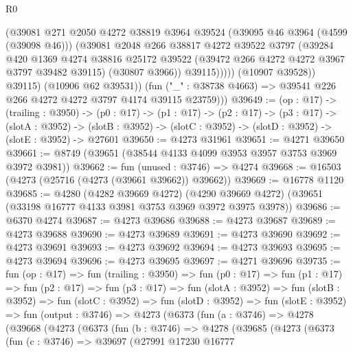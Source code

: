 \begin{lexlean}{R0}
\begin{coremodule}
                    (@39081
                      @271
                      @2050
                      @4272
                      @38819
                      @3964
                      @39524
                      (@39095 @46 @3964 (@4599 (@39098 @46)))
                      (@39081
                        @2048
                        @266
                        @38817
                        @4272
                        @39522
                        @3797
                        (@39284
                          @420
                          @1369
                          @4274
                          @38816
                          @25172
                          @39522
                          (@39472 @266 @4272 @4272 @3967 @3797 @39482 @39115)
                          (@30807 @3966))
                        @39115)))))
              (@10907 @39528))
            @39115)
          (@10906 @62 @39531))
        (fun ("_" : @38738 @4663) => @39541 @226 @266 @4272 @4272 @3797 @4174 @39115 @23759)))
@39649 := (op : @17) ->
  (trailing : @3950) ->
  (p0 : @17) ->
  (p1 : @17) ->
  (p2 : @17) ->
  (p3 : @17) ->
  (slotA : @3952) ->
  (slotB : @3952) -> (slotC : @3952) -> (slotD : @3952) -> (slotE : @3952) -> @27601
@39650 := @4273 @31961
@39651 := @4271 @39650
@39661 := @8749 (@39651 (@38544 @4133 @4099 @3953 @3957 @3753 @3969 @3972 @3981))
@39662 := fun (unused : @3746) => @4274
@39668 := @16503 (@4273 (@25716 (@4273 (@39661 @39662)) @39662))
@39669 := @16778 @1120
@39685 := @4280
    (@4282 @39669 @4272)
    (@4290 @39669 @4272)
    (@39651 (@33198 @16777 @4133 @3981 @3753 @3969 @3972 @3975 @3978))
@39686 := @6370 @4274
@39687 := @4273 @39686
@39688 := @4273 @39687
@39689 := @4273 @39688
@39690 := @4273 @39689
@39691 := @4273 @39690
@39692 := @4273 @39691
@39693 := @4273 @39692
@39694 := @4273 @39693
@39695 := @4273 @39694
@39696 := @4273 @39695
@39697 := @4271 @39696
@39735 := fun (op : @17) =>
  fun (trailing : @3950) =>
  fun (p0 : @17) =>
  fun (p1 : @17) =>
  fun (p2 : @17) =>
  fun (p3 : @17) =>
  fun (slotA : @3952) =>
  fun (slotB : @3952) =>
  fun (slotC : @3952) =>
  fun (slotD : @3952) =>
  fun (slotE : @3952) =>
  fun (output : @3746) =>
  @4273
    (@6373
      (fun (a : @3746) =>
      @4278
        (@39668
          (@4273
            (@6373
              (fun (b : @3746) =>
              @4278
                (@39685
                  (@4273
                    (@6373
                      (fun (c : @3746) =>
                      @39697
                        (@27991
                          @17230
                          @16777

\end{coremodule}
\end{lexlean}
